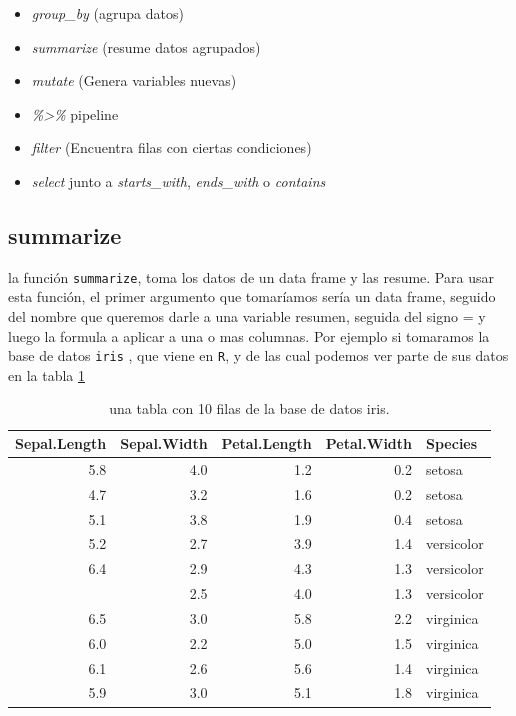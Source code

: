 \documentclass[]{book}
\providecommand{\tightlist}{%
  \setlength{\itemsep}{0pt}\setlength{\parskip}{0pt}}
\begin{document}
\begin{itemize}
\tightlist
\item
  \emph{group\_by} (agrupa datos)
\item
  \emph{summarize} (resume datos agrupados)
\item
  \emph{mutate} (Genera variables nuevas)
\item
  \emph{\%\textgreater{}\%} pipeline
\item
  \emph{filter} (Encuentra filas con ciertas condiciones)
\item
  \emph{select} junto a \emph{starts\_with}, \emph{ends\_with} o
  \emph{contains}
\end{itemize}

\hypertarget{summarize}{%
\subsection{summarize}\label{summarize}}

la función \texttt{summarize}, toma los datos de un data frame y las
resume. Para usar esta función, el primer argumento que tomaríamos sería
un data frame, seguido del nombre que queremos darle a una variable
resumen, seguida del signo = y luego la formula a aplicar a una o mas
columnas. Por ejemplo si tomaramos la base de datos \texttt{iris}
\citep{anderson1935irises}, que viene en \texttt{R}, y de las cual
podemos ver parte de sus datos en la tabla \ref{tab:iris}

\begin{table}

\caption{\label{tab:iris}una tabla con 10 filas de la base de datos iris.}
\centering
\begin{tabular}[t]{rrrrl}
\toprule
Sepal.Length & Sepal.Width & Petal.Length & Petal.Width & Species\\
\midrule
5.8 & 4.0 & 1.2 & 0.2 & setosa\\
4.7 & 3.2 & 1.6 & 0.2 & setosa\\
5.1 & 3.8 & 1.9 & 0.4 & setosa\\
5.2 & 2.7 & 3.9 & 1.4 & versicolor\\
6.4 & 2.9 & 4.3 & 1.3 & versicolor\\
\addlinespace
5.5 & 2.5 & 4.0 & 1.3 & versicolor\\
6.5 & 3.0 & 5.8 & 2.2 & virginica\\
6.0 & 2.2 & 5.0 & 1.5 & virginica\\
6.1 & 2.6 & 5.6 & 1.4 & virginica\\
5.9 & 3.0 & 5.1 & 1.8 & virginica\\
\bottomrule
\end{tabular}
\end{table}
\end{document}
